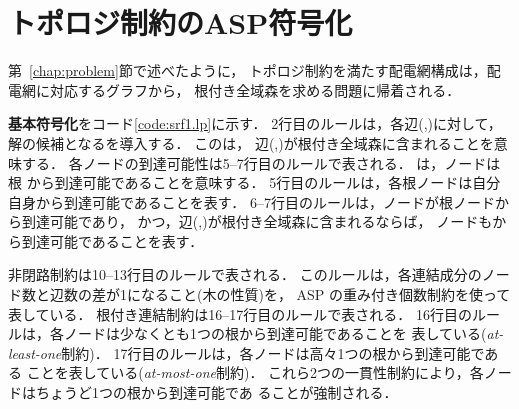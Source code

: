 \begin{itemize}
\end{itemize}


\section{トポロジ制約のASP符号化}\label{chap:topology}





第~\ref{chap:problem}節で述べたように，
トポロジ制約を満たす配電網構成は，配電網に対応するグラフから，
根付き全域森を求める問題に帰着される．

\textbf{基本符号化}をコード\ref{code:srf1.lp}に示す．
2行目のルールは，各辺(,)に対して，
解の候補となるを導入する．
このは，
辺(,)が根付き全域森に含まれることを意味する．
%
各ノードの到達可能性は5--7行目のルールで表される．
は，ノードは根
から到達可能であることを意味する．
5行目のルールは，各根ノードは自分自身から到達可能であることを表す．
6--7行目のルールは，ノードが根ノードから到達可能であり，
かつ，辺(,)が根付き全域森に含まれるならば，
ノードもから到達可能であることを表す．

非閉路制約は10--13行目のルールで表される．
このルールは，各連結成分のノード数と辺数の差が1になること(木の性質)を，
ASP の重み付き個数制約を使って表している．
%
根付き連結制約は16--17行目のルールで表される．
16行目のルールは，各ノードは少なくとも1つの根から到達可能であることを
表している(\textit{at-least-one}制約)．
17行目のルールは，各ノードは高々1つの根から到達可能である
ことを表している(\textit{at-most-one}制約)．
これら2つの一貫性制約により，各ノードはちょうど1つの根から到達可能であ
ることが強制される．

